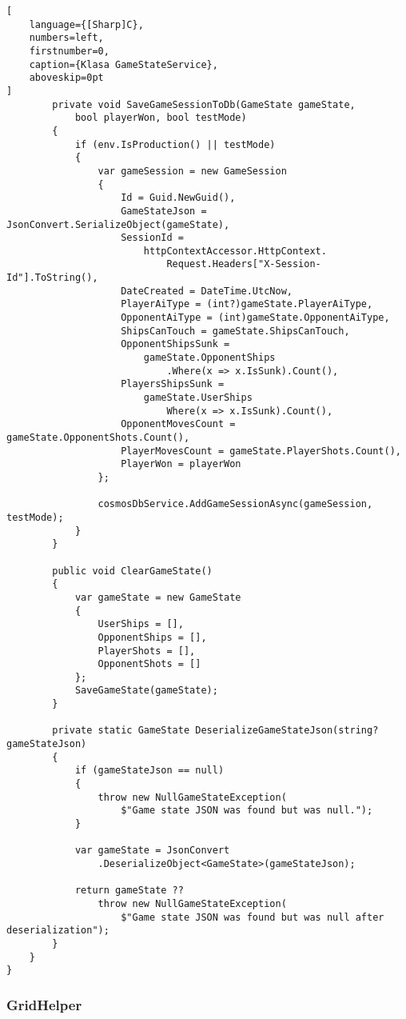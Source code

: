 \begin{addmargin}[0mm]{0mm}
\begin{lstlisting}[
    language={[Sharp]C},
    numbers=left,
    firstnumber=0,
    caption={Klasa GameStateService},
    aboveskip=0pt
]
        private void SaveGameSessionToDb(GameState gameState,
            bool playerWon, bool testMode)
        {
            if (env.IsProduction() || testMode)
            {
                var gameSession = new GameSession
                {
                    Id = Guid.NewGuid(),
                    GameStateJson = JsonConvert.SerializeObject(gameState),
                    SessionId =
                        httpContextAccessor.HttpContext.
                            Request.Headers["X-Session-Id"].ToString(),
                    DateCreated = DateTime.UtcNow,
                    PlayerAiType = (int?)gameState.PlayerAiType,
                    OpponentAiType = (int)gameState.OpponentAiType,
                    ShipsCanTouch = gameState.ShipsCanTouch,
                    OpponentShipsSunk =
                        gameState.OpponentShips
                            .Where(x => x.IsSunk).Count(),
                    PlayersShipsSunk =
                        gameState.UserShips
                            Where(x => x.IsSunk).Count(),
                    OpponentMovesCount = gameState.OpponentShots.Count(),
                    PlayerMovesCount = gameState.PlayerShots.Count(),
                    PlayerWon = playerWon
                };

                cosmosDbService.AddGameSessionAsync(gameSession, testMode);
            }
        }

        public void ClearGameState()
        {
            var gameState = new GameState
            {
                UserShips = [],
                OpponentShips = [],
                PlayerShots = [],
                OpponentShots = []
            };
            SaveGameState(gameState);
        }

        private static GameState DeserializeGameStateJson(string? gameStateJson)
        {
            if (gameStateJson == null)
            {
                throw new NullGameStateException(
                    $"Game state JSON was found but was null.");
            }

            var gameState = JsonConvert
                .DeserializeObject<GameState>(gameStateJson);

            return gameState ??
                throw new NullGameStateException(
                    $"Game state JSON was found but was null after deserialization");
        }
    }
}
\end{lstlisting}
\end{addmargin}


\tocless\subsubsection{GridHelper}

